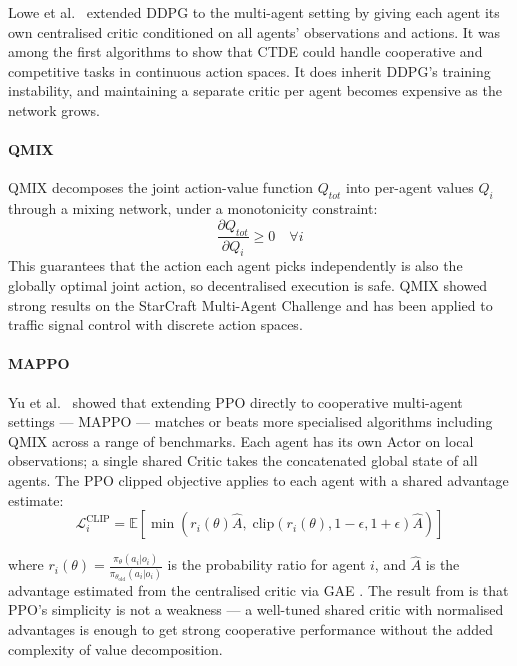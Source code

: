 \documentclass[11pt, a4paper]{report}
\begin{document}
Lowe et al.\ \cite{lowe2017multi} extended DDPG to the multi-agent setting by giving each agent its own centralised critic conditioned on all agents' observations and actions. It was among the first algorithms to show that CTDE could handle cooperative and competitive tasks in continuous action spaces. It does inherit DDPG's training instability, and maintaining a separate critic per agent becomes expensive as the network grows.

\paragraph{QMIX}

QMIX \cite{rashid2018qmix} decomposes the joint action-value function $Q_{tot}$ into per-agent values $Q_i$ through a mixing network, under a monotonicity constraint:
\begin{equation}
\frac{\partial Q_{tot}}{\partial Q_i} \geq 0 \quad \forall i
\label{eq:qmix_monotone}
\end{equation}
This guarantees that the action each agent picks independently is also the globally optimal joint action, so decentralised execution is safe. QMIX showed strong results on the StarCraft Multi-Agent Challenge \cite{samvelyan2019starcraft} and has been applied to traffic signal control with discrete action spaces.

\paragraph{MAPPO}

Yu et al.\ \cite{yu2022surprising} showed that extending PPO directly to cooperative multi-agent settings --- MAPPO --- matches or beats more specialised algorithms including QMIX across a range of benchmarks. Each agent has its own Actor on local observations; a single shared Critic takes the concatenated global state of all agents. The PPO clipped objective applies to each agent with a shared advantage estimate:
\begin{equation}
\mathcal{L}^{\text{CLIP}}_i = \mathbb{E}\left[\min\left(r_i(\theta)\hat{A}, \;\text{clip}(r_i(\theta), 1-\epsilon, 1+\epsilon)\hat{A}\right)\right]
\label{eq:mappo_clip}
\end{equation}

where $r_i(\theta) = \frac{\pi_\theta(a_i | o_i)}{\pi_{\theta_\text{old}}(a_i | o_i)}$ is the probability ratio for agent $i$, and $\hat{A}$ is the advantage estimated from the centralised critic via GAE \cite{schulman2015high}. The result from \cite{yu2022surprising} is that PPO's simplicity is not a weakness --- a well-tuned shared critic with normalised advantages is enough to get strong cooperative performance without the added complexity of value decomposition.
\end{document}
